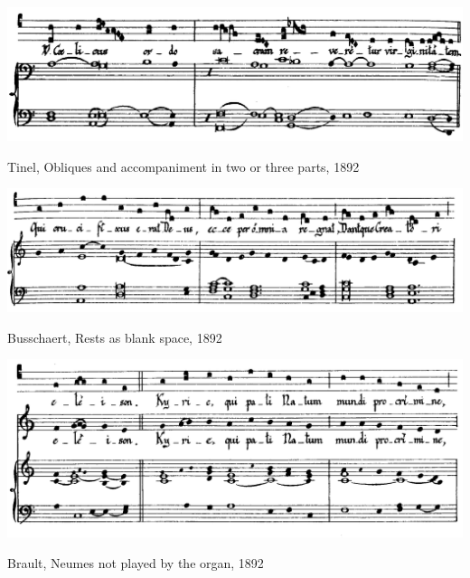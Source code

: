 \vspace*{\fill}

\clearpage

\vspace*{\fill}

\begin{example}
  \centering
  \includegraphics[width=\linewidth]{c/3/ex/tinel_4_2.png}
  \caption{Tinel, Obliques and accompaniment in two or three parts, 1892}
  \label{mus:tinel_4_2}
\end{example}

\vspace*{\fill}

\begin{example}
  \centering
  \includegraphics[width=\linewidth]{c/3/ex/busschaert_4_11.png}
  \caption{Busschaert, Rests as blank space, 1892}
  \label{mus:busschaert_4_11}
\end{example}

\vspace*{\fill}

\begin{example}
  \centering
  \includegraphics[width=\linewidth]{c/3/ex/brault_2_12.png}
  \caption{Brault, Neumes not played by the organ, 1892}
  \label{mus:brault_2_12}
\end{example}

